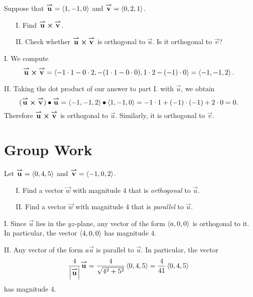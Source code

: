 \documentclass[noauthor, handout]{ximera}
\begin{document}
\begin{problem}
Suppose that $\vec{u} = \vector{1,-1,0}$ and $\vec{v} = \vector{0,2,1}$.

\begin{itemize}
\item[I.] Find $\vec{u} \cross \vec{v}$.
\item[II.] Check whether $\vec{u} \cross \vec{v}$ is orthogonal to $\vec{u}$.  Is it orthogonal to $\vec{v}$?  
\end{itemize}

\begin{freeResponse}
I. We compute
$$
\vec{u} \cross \vec{v} = \left<-1 \cdot 1 - 0 \cdot 2, -(1 \cdot 1- 0 \cdot 0), 1 \cdot 2 - (-1) \cdot 0\right> = \left<-1,-1,2\right>.
$$

II. Taking the dot product of our answer to part I. with $\vec{u}$, we obtain
$$
(\vec{u} \cross \vec{v}) \dotp \vec{u} = \left<-1,-1,2\right> \dotp \left<1,-1,0\right> = -1 \cdot 1 + (-1) \cdot (-1) + 2 \cdot 0 = 0.
$$
Therefore $\vec{u} \cross \vec{v}$ is orthogonal to $\vec{u}$. Similarly, it is orthogonal to $\vec{v}$. 
\end{freeResponse}

\end{problem}



\section{Group Work}

\begin{problem}
Let $\vec{u} = \vector{0,4,5}$ and $\vec{v} =\vector{-1,0,2}$. 
\begin{itemize}
\item[I.] Find a vector $\vec{w}$ with magnitude 4 that is \emph{orthogonal} to $\vec{u}$.
\item[II.] Find a vector $\vec{w}$ with magnitude 4 that is \emph{parallel} to $\vec{u}$.

\end{itemize}
\begin{freeResponse}
I. Since $\vec{u}$ lies in the $yz$-plane, any vector of the form $\vector{a,0,0}$ is orthogonal to it. In particular, the vector $\vector{4,0,0}$ has magnitude $4$. 

II. Any vector of the form $a \vec{u}$ is parallel to $\vec{u}$. In particular, the vector
$$
\frac{4}{\left|\vec{u}\right|} \vec{u} = \frac{4}{\sqrt{4^2 + 5^2}} \vector{0,4,5} = \frac{4}{41}\vector{0,4,5}
$$
has magnitude $4$. 
\end{freeResponse}
\end{problem}
\end{document}
